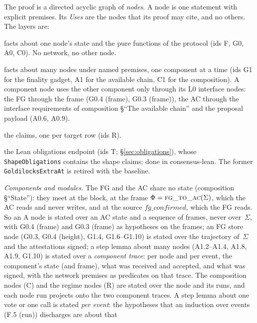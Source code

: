 \documentclass{article}
\newcommand{\Fr}{\Phi}
\newcommand{\fname}[1]{\text{\textsc{#1}}}
\begin{document}
The proof is a directed acyclic graph of \emph{nodes}.  A node is one
statement with explicit premises.  Its \emph{Uses} are the nodes that its
proof may cite, and no others.  The layers are:
\begin{description}[itemsep=0pt]
\item[L0, foundations:] facts about one node's state and the pure functions of
  the protocol (ids \textsf{F}, \textsf{G0}, \textsf{A0}, \textsf{C0}).  No
  network, no other node.
\item[L1, components:] facts about many nodes under named premises, one
  component at a time (ids \textsf{G1} for the finality gadget, \textsf{A1}
  for the available chain, \textsf{C1} for the composition).  A component
  node uses the other component only through its L0 interface nodes:
  the FG through the frame (G0.4 (frame), G0.3 (frame)), the AC through the
  interface requirements of composition \S``The available chain'' and the
  proposal payload (A0.6, A0.9).
\item[L2, regimes:] the claims, one per target row (ids \textsf{R}).
\item[L3, assembly:] the Lean obligations endpoint (ids \textsf{T};
  \S\ref{sec:obligations}), whose \texttt{ShapeObligations} contains the shape claims;
  done in consensus-lean.  The former \texttt{GoldilocksExtraAt} is retired
  with the baseline.
\end{description}
\emph{Components and modules.}  The FG and the AC share no state
(composition \S``State''): they meet at the block, at the frame
$\Fr=\fname{fg\_to\_ac}(\Sigma)$, which the AC reads and never writes, and at
the source $\mathit{fg\_confirmed}$, which the FG reads.  So an \textsf{A} node
is stated over an AC state and a sequence of frames, never over~$\Sigma$, with
G0.4 (frame) and G0.3 (frame) as hypotheses on the frames; an FG store node
(G0.3, G0.4 (height), G1.4, G1.6--G1.10) is stated over the trajectory
of~$\Sigma$ and the attestations signed; a step lemma about many nodes (A1.2--A1.4,
A1.8, A1.9, G1.10) is stated over a \emph{component trace}: per node and per
event, the component's state (and frame), what was received and accepted, and
what was signed, with the network premises as predicates on that trace.  The
composition nodes (\textsf{C}) and the regime nodes (\textsf{R}) are stated over
the node and its runs, and each node run projects onto the two component
traces.  A step lemma about one vote or one call is stated \emph{per event}:
the hypotheses that an induction over events (F.5 (run)) discharges are about that
\end{document}

